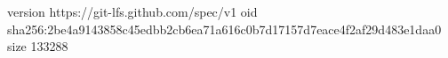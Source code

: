 version https://git-lfs.github.com/spec/v1
oid sha256:2be4a9143858c45edbb2cb6ea71a616c0b7d17157d7eace4f2af29d483e1daa0
size 133288
